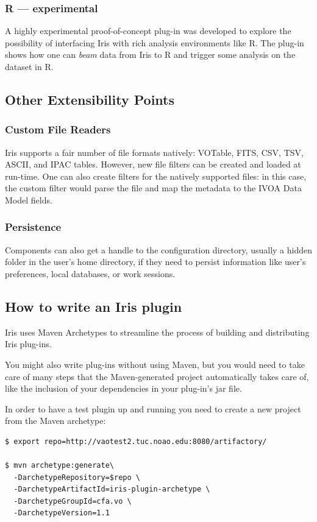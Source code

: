 \documentclass[final,5p,authoryear]{elsarticle}
\begin{document}
\subsubsection{R --- experimental} A highly experimental proof-of-concept
plug-in was developed to explore the possibility of interfacing Iris with rich
analysis environments like R. The plug-in shows how one can \emph{beam} data
from Iris to R and trigger some analysis on the dataset in R.


\subsection{Other Extensibility Points}

\subsubsection{Custom File Readers} Iris supports a fair number of file formats
natively: VOTable, FITS, CSV, TSV, ASCII, and IPAC tables. However, new file
filters can be created and loaded at run-time. One can also create filters for
the natively supported files: in this case, the custom filter would parse the
file and map the metadata to the IVOA Data Model fields.

\subsubsection{Persistence} Components can also get a handle to the
configuration directory, usually a hidden folder in the user's home directory,
if they need to persist information like user's preferences, local databases, or
work sessions.



\subsection{How to write an Iris plugin} \label{sec:writeplugin} Iris uses Maven
Archetypes to streamline the process of building and distributing Iris plug-ins.

You might also write plug-ins without using Maven, but you would need to take
care of many steps that the Maven-generated project automatically takes care of,
like the inclusion of your dependencies in your plug-in's jar file.

In order to have a test plugin up and running you need to create a new project
from the Maven archetype:

\begin{lstlisting}[style=code]
$ export repo=http://vaotest2.tuc.noao.edu:8080/artifactory/

$ mvn archetype:generate\
  -DarchetypeRepository=$repo \
  -DarchetypeArtifactId=iris-plugin-archetype \
  -DarchetypeGroupId=cfa.vo \
  -DarchetypeVersion=1.1
\end{lstlisting}
\end{document}
